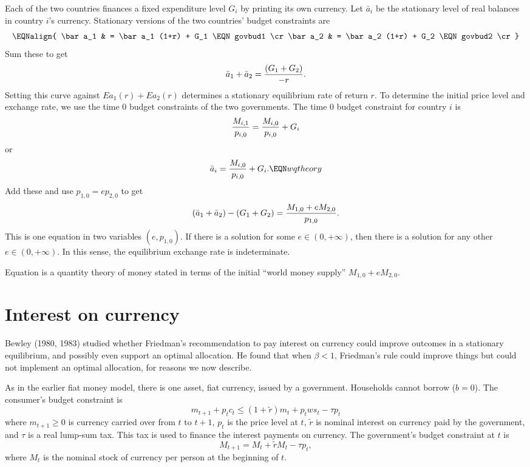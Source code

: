 Each of the two countries finances a fixed
expenditure level $G_i$ by printing its own currency.
Let $\bar a_i$ be the stationary level of real balances in
country $i$'s currency.
Stationary versions  of the two  countries' budget constraints are
$$\EQNalign{ \bar a_1 & = \bar a_1 (1+r) + G_1 \EQN govbud1 \cr
             \bar a_2 & = \bar a_2 (1+r) + G_2 \EQN govbud2 \cr} $$
Sum these to get
 $$  \bar a_1 + \bar a_2 ={ \left( G_1 + G_2  \right) \over - r} .$$
Setting this curve against $E a_1(r) + E a_2(r)$ determines
a stationary equilibrium rate of return $r$.
To determine the initial price level  and exchange rate, we use the
time $0$ budget constraints of the two governments.  The time $0$
budget constraint for country $i$ is
$$ {M_{i,1} \over p_{i,0}}  = {M_{i,0} \over p_{i,0} } + G_i $$
or
$$ \bar a_i = {M_{i,0} \over p_{i,0}} + G_i.  \EQN wqtheory $$
Add these
and use $p_{1,0} = e p_{2,0}$ to get
$$ (\bar a_1 + \bar a_2) - (G_1 + G_2)  =
 {M_{1,0} + e M_{2,0} \over p_{1,0}}. $$
This is one equation in two variables $(e, p_{1,0})$.
If there is a solution for some $e \in (0, +\infty)$, then
there is a solution for any other $e \in (0, + \infty)$.
In this sense, the equilibrium exchange rate is indeterminate.

Equation  is a quantity theory of money stated in
terms of the initial ``world  money supply'' $M_{1,0} + e M_{2,0}$.




\section{Interest on currency}
    Bewley (1980, 1983)  studied whether
Friedman's recommendation to pay interest on currency could
improve outcomes in a stationary equilibrium, and possibly even
support an optimal allocation.  He found  that when
$\beta < 1$, Friedman's
rule could improve things but could
 not implement an optimal allocation, for reasons
we now describe.


As in the earlier fiat money model,
there is one asset,   fiat currency, issued by a government.
Households cannot borrow ($b=0$).
The consumer's budget constraint is
$$ m_{t+1} + p_t c_t \leq (1+\tilde r) m_t + p_t w s_t - \tau p_t $$
where $m_{t+1} \geq 0$ is currency carried over from
$t$ to $t+1$,  $p_t$ is the price level at $t$, $\tilde r$ is
nominal interest  on currency paid by the government, and
$\tau $ is a real lump-sum tax.   This tax is used
to finance the interest payments on currency.
The government's budget constraint   at $t$ is
$$ M_{t+1} = M_t +  \tilde r M_t  - \tau p_t , $$
where $M_t$ is the nominal stock of currency per person
at the beginning of $t$.

